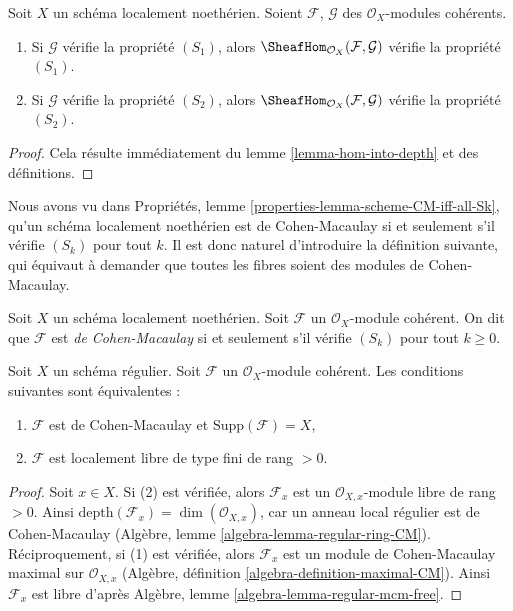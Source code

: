\begin{lemma}
\label{lemma-hom-into-S2}
Soit $X$ un schéma localement noethérien. Soient $\mathcal{F}$, $\mathcal{G}$
des $\mathcal{O}_X$-modules cohérents.
\begin{enumerate}
\item Si $\mathcal{G}$ vérifie la propriété $(S_1)$, alors
$\SheafHom_{\mathcal{O}_X}(\mathcal{F}, \mathcal{G})$ vérifie la propriété $(S_1)$.
\item Si $\mathcal{G}$ vérifie la propriété $(S_2)$, alors
$\SheafHom_{\mathcal{O}_X}(\mathcal{F}, \mathcal{G})$ vérifie la propriété $(S_2)$.
\end{enumerate}
\end{lemma}

\begin{proof}
Cela résulte immédiatement du lemme \ref{lemma-hom-into-depth}
et des définitions.
\end{proof}

\noindent
Nous avons vu dans Propriétés, lemme \ref{properties-lemma-scheme-CM-iff-all-Sk},
qu'un schéma localement noethérien
est de Cohen-Macaulay si et seulement s'il vérifie $(S_k)$ pour tout $k$.
Il est donc naturel d'introduire la définition suivante, qui équivaut
à demander que toutes les fibres soient des modules de Cohen-Macaulay.

\begin{definition}
\label{definition-Cohen-Macaulay}
Soit $X$ un schéma localement noethérien.
Soit $\mathcal{F}$ un $\mathcal{O}_X$-module cohérent.
On dit que $\mathcal{F}$ est {\it de Cohen-Macaulay} si et seulement s'il
vérifie $(S_k)$ pour tout $k \geq 0$.
\end{definition}

\begin{lemma}
\label{lemma-Cohen-Macaulay-over-regular}
Soit $X$ un schéma régulier. Soit $\mathcal{F}$ un
$\mathcal{O}_X$-module cohérent. Les conditions suivantes sont équivalentes :
\begin{enumerate}
\item $\mathcal{F}$ est de Cohen-Macaulay et $\text{Supp}(\mathcal{F}) = X$,
\item $\mathcal{F}$ est localement libre de type fini de rang $> 0$.
\end{enumerate}
\end{lemma}

\begin{proof}
Soit $x \in X$. Si (2) est vérifiée, alors $\mathcal{F}_x$ est un
$\mathcal{O}_{X, x}$-module libre de rang $> 0$. Ainsi
$\text{depth}(\mathcal{F}_x) = \dim(\mathcal{O}_{X, x})$,
car un anneau local régulier est de Cohen-Macaulay
(Algèbre, lemme \ref{algebra-lemma-regular-ring-CM}).
Réciproquement, si (1) est vérifiée, alors $\mathcal{F}_x$ est un
module de Cohen-Macaulay maximal sur $\mathcal{O}_{X, x}$
(Algèbre, définition \ref{algebra-definition-maximal-CM}).
Ainsi $\mathcal{F}_x$ est libre d'après
Algèbre, lemme \ref{algebra-lemma-regular-mcm-free}.
\end{proof}









